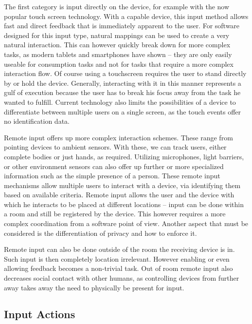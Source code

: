 \documentclass{acm_proc_article-sp}
\begin{document}
The first category is input directly on the device, for example with the now popular touch screen technology.
With a capable device, this input method allows fast and direct feedback that is immediately apparent to the user.
For software designed for this input type, natural mappings can be used to create a very natural interaction.
This can however quickly break down for more complex tasks, as modern tablets and smartphones have shown – they are only easily useable for consumption tasks and not for tasks that require a more complex interaction flow.
Of course using a touchscreen requires the user to stand directly by or hold the device.
Generally, interacting with it in this manner represents a gulf of execution because the user has to break his focus away from the task he wanted to fulfill.
Current technology also limits the possibilities of a device to differentiate between multiple users on a single screen, as the touch events offer no identification data.

Remote input offers up more complex interaction schemes.
These range from pointing devices to ambient sensors.
With these, we can track users, either complete bodies or just hands, as required. Utilizing microphones, light barriers, or other environment sensors can also offer up further or more specialized information such as the simple presence of a person.
These remote input mechanisms allow multiple users to interact with a device, via identifying them based on available criteria.
Remote input allows the user and the device with which he interacts to be placed at different locations – input can be done within a room and still be registered by the device.
This however requires a more complex coordination from a software point of view.
Another aspect that must be considered is the differentiation of privacy and how to enforce it.

Remote input can also be done outside of the room the receiving device is in.
Such input is then completely location irrelevant.
However enabling or even allowing feedback becomes a non-trivial task.
Out of room remote input also decreases social contact with other humans, as controlling devices from further away takes away the need to physically be present for input.

\subsection{Input Actions}
\end{document}
